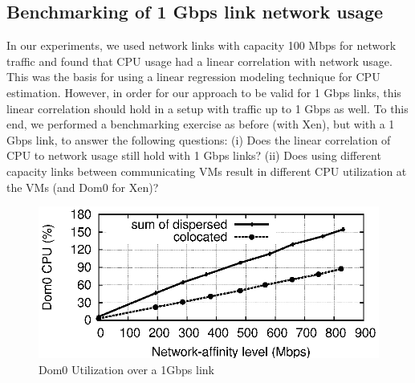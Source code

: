 


\subsection{Benchmarking of 1 Gbps link network usage}
In our experiments, we used network links with capacity 100 Mbps 
for network traffic
and found that CPU usage had a linear correlation with network usage.
This was the basis for using a linear regression modeling technique
for CPU estimation. However, in order for our approach to be valid
for 1 Gbps links, this linear correlation should hold in a setup with
traffic up to 1 Gbps as well. To this end, we performed a benchmarking
exercise as before (with Xen), but with a 1 Gbps link, to answer
the following questions:
(i) Does the linear correlation of CPU to network usage still hold 
with 1 Gbps links?
(ii) Does using different capacity links between communicating VMs 
result in different CPU utilization at the VMs (and Dom0 for Xen)?

\begin{figure}[t]
\centering
\includegraphics[scale=0.75]{jss-figures/new-aff-1G-benchmark/multi-bytetcp-1Gbps-nogsotsoboth-0iptabs-5120-dom0-cpu-vs-affine-curve.eps}
\caption{Dom0 Utilization over a 1Gbps link}
\label{fig:link1gbps}
\end{figure}



